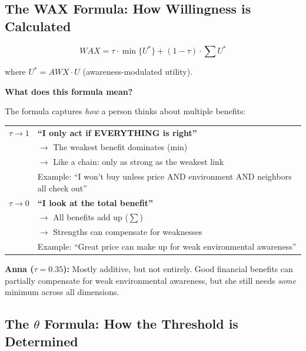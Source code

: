 \subsection{The WAX Formula: How Willingness is Calculated}

\begin{equation}
\boxed{WAX = \tau \cdot \min\{U^*\} + (1-\tau) \cdot \sum U^*}
\label{eq:wax-formula}
\end{equation}

where $U^* = AWX \cdot U$ (awareness-modulated utility).

\begin{intuition}
\textbf{What does this formula mean?}

The formula captures \textit{how} a person thinks about multiple benefits:

\begin{center}
\begin{tabular}{cp{10cm}}
$\tau \rightarrow 1$ & \textbf{``I only act if EVERYTHING is right''}\\
& $\rightarrow$ The weakest benefit dominates (min)\\
& $\rightarrow$ Like a chain: only as strong as the weakest link\\
& Example: ``I won't buy unless price AND environment AND neighbors all check out''\\[8pt]

$\tau \rightarrow 0$ & \textbf{``I look at the total benefit''}\\
& $\rightarrow$ All benefits add up ($\sum$)\\
& $\rightarrow$ Strengths can compensate for weaknesses\\
& Example: ``Great price can make up for weak environmental awareness''\\
\end{tabular}
\end{center}

\textbf{Anna ($\tau = 0.35$):} Mostly additive, but not entirely. Good financial benefits can partially compensate for weak environmental awareness, but she still needs \textit{some} minimum across all dimensions.
\end{intuition}

\subsection{The $\theta$ Formula: How the Threshold is Determined}

